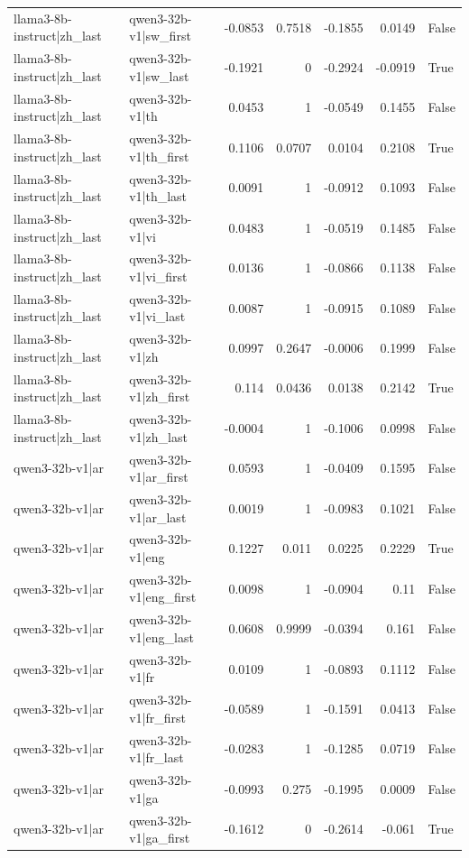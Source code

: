 \begin{table}
\begin{tabular}{l l r r r r l}
llama3-8b-instruct|zh_last & qwen3-32b-v1|sw_first & -0.0853 & 0.7518 & -0.1855 & 0.0149 & False \\
llama3-8b-instruct|zh_last & qwen3-32b-v1|sw_last & -0.1921 & 0 & -0.2924 & -0.0919 & True \\
llama3-8b-instruct|zh_last & qwen3-32b-v1|th & 0.0453 & 1 & -0.0549 & 0.1455 & False \\
llama3-8b-instruct|zh_last & qwen3-32b-v1|th_first & 0.1106 & 0.0707 & 0.0104 & 0.2108 & True \\
llama3-8b-instruct|zh_last & qwen3-32b-v1|th_last & 0.0091 & 1 & -0.0912 & 0.1093 & False \\
llama3-8b-instruct|zh_last & qwen3-32b-v1|vi & 0.0483 & 1 & -0.0519 & 0.1485 & False \\
llama3-8b-instruct|zh_last & qwen3-32b-v1|vi_first & 0.0136 & 1 & -0.0866 & 0.1138 & False \\
llama3-8b-instruct|zh_last & qwen3-32b-v1|vi_last & 0.0087 & 1 & -0.0915 & 0.1089 & False \\
llama3-8b-instruct|zh_last & qwen3-32b-v1|zh & 0.0997 & 0.2647 & -0.0006 & 0.1999 & False \\
llama3-8b-instruct|zh_last & qwen3-32b-v1|zh_first & 0.114 & 0.0436 & 0.0138 & 0.2142 & True \\
llama3-8b-instruct|zh_last & qwen3-32b-v1|zh_last & -0.0004 & 1 & -0.1006 & 0.0998 & False \\
qwen3-32b-v1|ar & qwen3-32b-v1|ar_first & 0.0593 & 1 & -0.0409 & 0.1595 & False \\
qwen3-32b-v1|ar & qwen3-32b-v1|ar_last & 0.0019 & 1 & -0.0983 & 0.1021 & False \\
qwen3-32b-v1|ar & qwen3-32b-v1|eng & 0.1227 & 0.011 & 0.0225 & 0.2229 & True \\
qwen3-32b-v1|ar & qwen3-32b-v1|eng_first & 0.0098 & 1 & -0.0904 & 0.11 & False \\
qwen3-32b-v1|ar & qwen3-32b-v1|eng_last & 0.0608 & 0.9999 & -0.0394 & 0.161 & False \\
qwen3-32b-v1|ar & qwen3-32b-v1|fr & 0.0109 & 1 & -0.0893 & 0.1112 & False \\
qwen3-32b-v1|ar & qwen3-32b-v1|fr_first & -0.0589 & 1 & -0.1591 & 0.0413 & False \\
qwen3-32b-v1|ar & qwen3-32b-v1|fr_last & -0.0283 & 1 & -0.1285 & 0.0719 & False \\
qwen3-32b-v1|ar & qwen3-32b-v1|ga & -0.0993 & 0.275 & -0.1995 & 0.0009 & False \\
qwen3-32b-v1|ar & qwen3-32b-v1|ga_first & -0.1612 & 0 & -0.2614 & -0.061 & True \\

\end{tabular}
\end{table}

